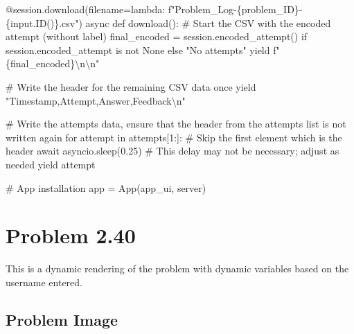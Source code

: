 \documentclass[
  letterpaper,
  DIV=11,
  numbers=noendperiod]{scrreprt}
\newenvironment{Shaded}{\begin{snugshade}}{\end{snugshade}}
\newcommand{\NormalTok}[1]{\textcolor[rgb]{0.00,0.23,0.31}{#1}}
\begin{document}
\begin{Shaded}
\begin{Highlighting}[]
\NormalTok{    @session.download(filename=lambda: f"Problem\_Log{-}\{problem\_ID\}{-}\{input.ID()\}.csv")}
\NormalTok{    async def download():}
\NormalTok{        \# Start the CSV with the encoded attempt (without label)}
\NormalTok{        final\_encoded = session.encoded\_attempt() if session.encoded\_attempt is not None else "No attempts"}
\NormalTok{        yield f"\{final\_encoded\}\textbackslash{}n\textbackslash{}n"}
        
\NormalTok{        \# Write the header for the remaining CSV data once}
\NormalTok{        yield "Timestamp,Attempt,Answer,Feedback\textbackslash{}n"}
        
\NormalTok{        \# Write the attempts data, ensure that the header from the attempts list is not written again}
\NormalTok{        for attempt in attempts[1:]:  \# Skip the first element which is the header}
\NormalTok{            await asyncio.sleep(0.25)  \# This delay may not be necessary; adjust as needed}
\NormalTok{            yield attempt}


\NormalTok{\# App installation}
\NormalTok{app = App(app\_ui, server)}
\end{Highlighting}
\end{Shaded}

\chapter*{Problem 2.40}\label{problem-2.40}


This is a dynamic rendering of the problem with dynamic variables based
on the username entered.

\section*{Problem Image}\label{problem-image-11}

\end{document}
